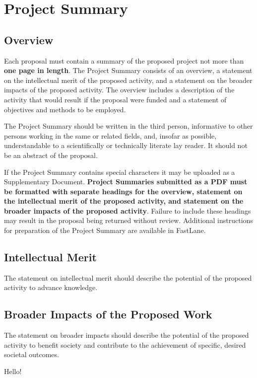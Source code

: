 \section{Project Summary}
\subsection{Overview} 
Each proposal must contain a summary of the proposed project not more than {\bf one page in length}. The Project
Summary consists of an overview, a statement on the intellectual merit of the proposed activity, and a statement
on the broader impacts of the proposed activity.
The overview includes a description of the activity that would result if the proposal were funded and a statement
of objectives and methods to be employed.  

The Project Summary should be written in the third person, informative to other persons working in
the same or related fields, and, insofar as possible, understandable to a scientifically or technically 
literate lay reader. It should not be an abstract of the proposal.

If the Project Summary contains special characters it may be uploaded as a Supplementary Document.
{\bf Project Summaries submitted as a PDF must be formatted with separate headings for the overview, statement on the
intellectual merit of the proposed activity, and statement on the broader impacts of the proposed activity}. Failure
to include these headings may result in the proposal being returned without review.
Additional instructions for preparation of the Project Summary are available in FastLane.\\
\subsection{Intellectual Merit} 
The statement on intellectual merit should describe the potential of the proposed activity to advance knowledge.
\subsection{Broader Impacts of the Proposed Work} 
The statement on broader impacts should describe the potential of the proposed activity to benefit society and contribute to the achievement of specific, desired societal outcomes.

Hello!